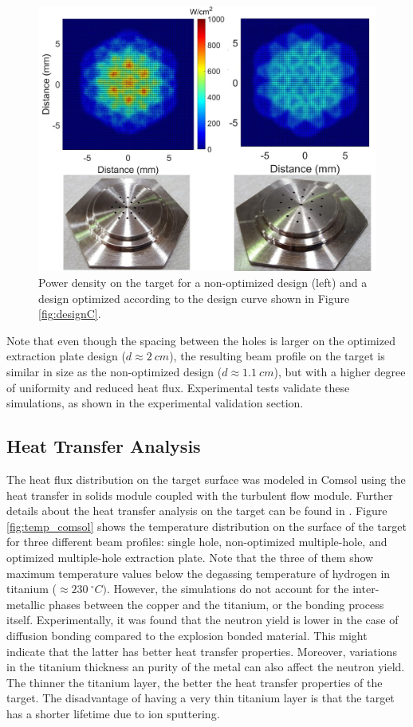 \documentclass[review]{elsarticle}
\begin{document}
\begin{figure}
	\centering
	\includegraphics[height=0.6\textwidth]{pics/comparisonHeatMaps_plates2}
	\caption{Power density on the target for a non-optimized design (left) and a design optimized according to the design curve shown in Figure \ref{fig:designC}. }
	\label{fig:heat maps}
\end{figure}

Note that even though the spacing between the holes is larger on the optimized extraction plate design ($d \approx 2 \ cm$), the resulting beam profile on the target is similar in size as the non-optimized design ($d\approx 1.1 \ cm$), but with a higher degree of uniformity and reduced heat flux. Experimental tests validate these simulations, as shown in the experimental validation section.

\subsection{Heat Transfer Analysis}

The heat flux distribution on the target surface was modeled in Comsol using the heat transfer in solids module coupled with the turbulent flow module. Further details about the heat transfer analysis on the target can be found in \cite{CoryThesis}. Figure \ref{fig:temp_comsol} shows the temperature distribution on the surface of the target for three different beam profiles: single hole, non-optimized multiple-hole, and optimized multiple-hole extraction plate. Note that the three of them show maximum temperature values below the degassing temperature of hydrogen in titanium ($\approx 230\ ^{\circ}C)$. However, the simulations do not account for the inter-metallic phases between the copper and the titanium, or the bonding process itself. Experimentally, it was found that the neutron yield is lower in the case of diffusion bonding compared to the explosion bonded material. This might indicate that the latter has better heat transfer properties. Moreover, variations in the titanium thickness an purity of the metal can also affect the neutron yield. The thinner the titanium layer, the better the heat transfer properties of the target. The disadvantage of having a very thin titanium layer is that the target has a shorter lifetime due to ion sputtering.
\end{document}
